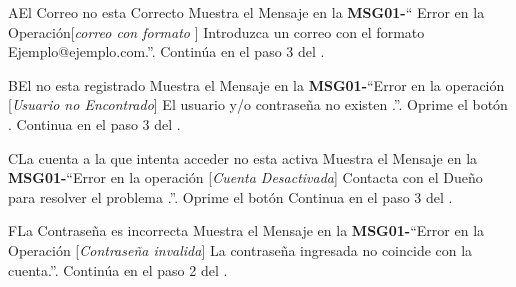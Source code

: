 	\begin{UCtrayectoriaA}{A}{El Correo no esta Correcto}
			\UCpaso Muestra el Mensaje en la  {\bf MSG01-}`` Error en la Operación[{\em correo con formato }] Introduzca un correo con el formato Ejemplo@ejemplo.com.''.
			\UCpaso Continúa en el paso 3 del .
		\end{UCtrayectoriaA}
		\begin{UCtrayectoriaA}{B}{El \UCactor no esta registrado}
			\UCpaso Muestra el Mensaje en la  {\bf MSG01-}``Error en la operación [{\em Usuario no Encontrado}] El usuario y/o contraseña no existen  .''.
			\UCpaso[\UCactor] Oprime el botón .
			\UCpaso[] Continua en el paso 3 del .
		\end{UCtrayectoriaA}		
		\begin{UCtrayectoriaA}{C}{La cuenta a la que intenta acceder no esta activa}
			\UCpaso Muestra el Mensaje en la  {\bf MSG01-}``Error en la operación [{\em Cuenta Desactivada}] Contacta con el Dueño para resolver el problema .''.
			\UCpaso[\UCactor] Oprime el botón 
			\UCpaso Continua en el paso 3 del .
		\end{UCtrayectoriaA}
		\begin{UCtrayectoriaA}{F}{La Contraseña es incorrecta}
			\UCpaso Muestra el Mensaje en la  {\bf MSG01-}``Error en la Operación [{\em Contraseña invalida}] La contraseña ingresada no coincide con la cuenta.''.
			\UCpaso Continúa en el paso 2 del .
		\end{UCtrayectoriaA}
